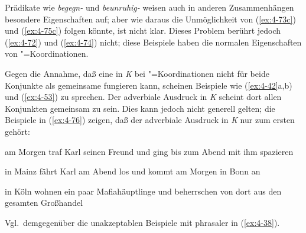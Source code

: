\documentclass[output=paper]{langsci/langscibook}
\begin{document}
\begin{exe}
\ex
\label{ex:4-74}
\begin{xlist}
\end{xlist}
\ex
\label{ex:4-75}
\begin{xlist}


\end{xlist}
\end{exe}
Prädikate wie \textit{begegn-} und \textit{beunruhig-} weisen auch in anderen Zusammenhängen besondere Eigenschaften auf; aber wie daraus die Unmöglichkeit von (\ref{ex:4-73c}) und (\ref{ex:4-75c}) folgen könnte, ist nicht klar. Dieses Problem berührt jedoch (\ref{ex:4-72}) und (\ref{ex:4-74}) nicht; diese Beispiele haben die normalen Eigenschaften von "=Koordinationen.

\ssubsection{}%
\label{subsec:4-3-7}
Gegen die Annahme, daß eine  in \textit{K} bei "=Koordinationen nicht für beide Konjunkte als gemeinsame  fungieren kann, scheinen Beispiele wie (\ref{ex:4-42}a,b) und (\ref{ex:4-53}) zu sprechen. Der adverbiale Ausdruck in \textit{K} scheint dort allen Konjunkten gemeinsam zu sein. Dies kann jedoch nicht generell gelten; die Beispiele in (\ref{ex:4-76}) zeigen, daß der adverbiale Ausdruck in\textit{ K} nur zum ersten  gehört:


\begin{exe}
\ex
\label{ex:4-76}
\begin{xlist}
\ex%
\label{ex:4-76a}
am Morgen traf Karl seinen Freund und ging bis zum Abend mit ihm spazieren

\ex%
\label{ex:4-76b}
in Mainz fährt Karl am Abend los und kommt am Morgen in Bonn an

\ex%
\label{ex:4-76c}
in Köln wohnen ein paar Mafiahäuptlinge und beherrschen von dort aus den gesamten Großhandel
\end{xlist}
\end{exe}
Vgl.\ demgegenüber die unakzeptablen Beispiele mit phrasaler  in (\ref{ex:4-38}).
\end{document}
